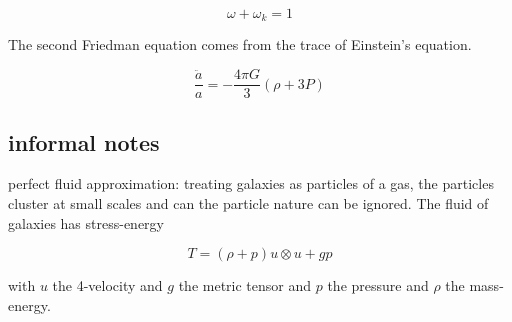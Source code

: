 \begin{equation}
    \omega + \omega_k = 1 
\end{equation}

The second Friedman equation comes from the trace of Einstein's equation.

\begin{equation}
    \frac{\ddot a}{a} = -\frac{4\pi G}{3}(\rho + 3P)
\end{equation}

\subsection{informal notes}
perfect fluid approximation: treating galaxies as particles of a gas, the particles cluster at small scales and can the particle nature can be ignored.
The fluid of galaxies has stress-energy 

\begin{equation*}
    T = (\rho+p) u\otimes u + gp
\end{equation*}

with $u$ the 4-velocity and $g$ the metric tensor and $p$ the pressure and $\rho$ the mass-energy.
